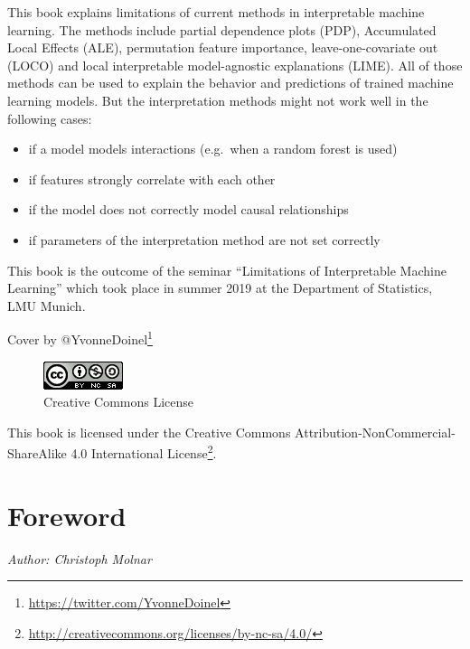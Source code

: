 \documentclass[]{krantz}
\providecommand{\tightlist}{%
  \setlength{\itemsep}{0pt}\setlength{\parskip}{0pt}}
\renewcommand{\href}[2]{#2\footnote{\url{#1}}}
\begin{document}
This book explains limitations of current methods in interpretable
machine learning. The methods include partial dependence plots (PDP),
Accumulated Local Effects (ALE), permutation feature importance,
leave-one-covariate out (LOCO) and local interpretable model-agnostic
explanations (LIME). All of those methods can be used to explain the
behavior and predictions of trained machine learning models. But the
interpretation methods might not work well in the following cases:

\begin{itemize}
\tightlist
\item
  if a model models interactions (e.g.~when a random forest is used)
\item
  if features strongly correlate with each other
\item
  if the model does not correctly model causal relationships
\item
  if parameters of the interpretation method are not set correctly
\end{itemize}

This book is the outcome of the seminar ``Limitations of Interpretable
Machine Learning'' which took place in summer 2019 at the Department of
Statistics, LMU Munich.

Cover by \href{https://twitter.com/YvonneDoinel}{@YvonneDoinel}

\begin{figure}
\centering
\includegraphics{images/by-nc-sa.png}
\caption{Creative Commons License}
\end{figure}

This book is licensed under the
\href{http://creativecommons.org/licenses/by-nc-sa/4.0/}{Creative
Commons Attribution-NonCommercial-ShareAlike 4.0 International License}.

\mainmatter

\chapter*{Foreword}\label{foreword}


\emph{Author: Christoph Molnar}
\end{document}
